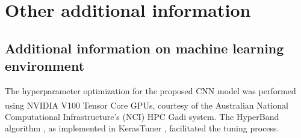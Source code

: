 \newpage

\section{Other additional information}
\label{supp_sec4_env}

\subsection{Additional information on machine learning environment}
\label{supp_sec4.1_ml_env}

The hyperparameter optimization for the proposed CNN model was performed using NVIDIA\textsuperscript{\textregistered} V100 Tensor Core GPUs,
courtesy of the Australian National Computational Infrastructure's (NCI) HPC Gadi system.
The HyperBand algorithm \cite{li2018hyperband}, as implemented in
KerasTuner \cite{omalley2019kerastuner}, facilitated the tuning process.

